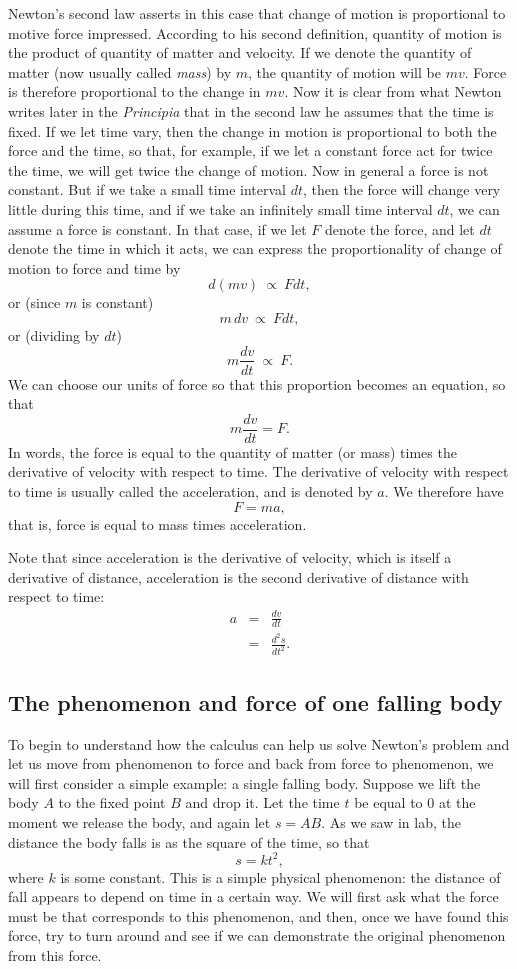 \documentclass[polutonikogreek,english,twoside,openright]{article}
\begin{document}
Newton's second law asserts in this case that change of motion is
proportional to motive force impressed.  According to his second
definition, quantity of motion is the product of quantity of matter
and velocity.  If we denote the quantity of matter (now usually called
{\em mass}) by $m$, the quantity of motion will be $mv$.  Force is
therefore proportional to the change in $mv$.  Now it is clear from
what Newton writes later in the {\em Principia} that in the second law
he assumes that the time is fixed.  If we let time vary, then the
change in motion is proportional to both the force and the time,
so that, for example, if we let a constant force act for twice the
time, we will get twice the change of motion.  Now in general a force
is not constant.  But if we take a small time interval $dt$, then the
force will change very little during this time, and if we take an
infinitely small time interval $dt$, we can assume a force is
constant.  In that case, if we let $F$ denote the force, and let $dt$
denote the time in which it acts, we can express the proportionality
of change of motion to force and time by
$$d(mv)\: \propto\: Fdt,$$
or (since $m$ is constant)
$$m\,dv\: \propto\: Fdt,$$
or (dividing by $dt$)
$$m\frac{dv}{dt}\: \propto\: F.$$
We can choose our units of force so that this proportion becomes an
equation, so that
$$m\frac{dv}{dt} = F.$$
In words, the force is equal to the quantity of matter (or mass) times
the derivative of velocity with respect to time.  The derivative of
velocity with respect to time is usually called the acceleration, and
is denoted by $a$.  We therefore have
$$F = ma,$$
that is, force is equal to mass times acceleration.

Note that since acceleration is the derivative of velocity, which is
itself a derivative of distance, acceleration is the second derivative
of distance with respect to time:
\begin{eqnarray*}
  a & = & \frac{dv}{dt}\\
    & = & \frac{d^2s}{dt^2}.
\end{eqnarray*}

\subsection*{The phenomenon and force of one falling body}
To begin to understand how the calculus can help us solve Newton's
problem and let us move from phenomenon to force and back from force
to phenomenon, we will first consider a simple example: a single
falling body.  Suppose we lift the body $A$ to the fixed point $B$ and
drop it.  Let the time $t$ be equal to $0$ at the moment we release
the body, and again let $s=AB$.  As we saw in lab, the distance the
body falls is as the square of the time, so that
$$s = kt^2,$$
where $k$ is some constant.  This is a simple physical phenomenon: the
distance of fall appears to depend on time in a certain way.  We will
first ask what the force must be that corresponds to this phenomenon,
and then, once we have found this force, try to turn around and see if
we can demonstrate the original phenomenon from this
force.\vspace{2ex}
\end{document}
